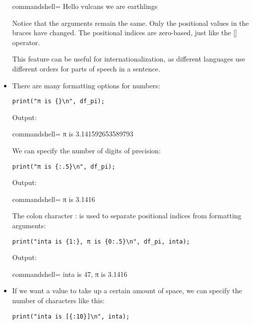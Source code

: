 \begin{itemize}
\begin{tcblisting}{commandshell={}}
Hello vulcans we are earthlings
\end{tcblisting}

Notice that the arguments remain the same. Only the positional values in the braces have changed. The positional indices are zero-based, just like the [] operator.

This feature can be useful for internationalization, as different languages use different orders for parts of speech in a sentence.

\item 
There are many formatting options for numbers:

\begin{lstlisting}[style=styleCXX]
print("π is {}\n", df_pi);
\end{lstlisting}

Output:

\begin{tcblisting}{commandshell={}}
π is 3.141592653589793
\end{tcblisting}

We can specify the number of digits of precision:

\begin{lstlisting}[style=styleCXX]
print("π is {:.5}\n", df_pi);
\end{lstlisting}

Output:

\begin{tcblisting}{commandshell={}}
π is 3.1416
\end{tcblisting}

The colon character : is used to separate positional indices from formatting arguments:

\begin{lstlisting}[style=styleCXX]
print("inta is {1:}, π is {0:.5}\n", df_pi, inta);
\end{lstlisting}

Output:

\begin{tcblisting}{commandshell={}}
inta is 47, π is 3.1416
\end{tcblisting}

\item 
If we want a value to take up a certain amount of space, we can specify the number of characters like this:

\begin{lstlisting}[style=styleCXX]
print("inta is [{:10}]\n", inta);
\end{lstlisting}


\end{itemize}
